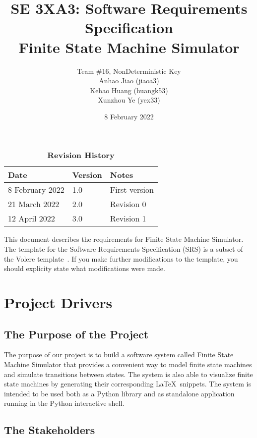 \documentclass[12pt, titlepage]{article}
\title{SE 3XA3: Software Requirements Specification \\
  Finite State Machine Simulator}
\author{
  Team \#16, NonDeterministic Key \\
  Anhao Jiao (jiaoa3) \\
  Kehao Huang (huangk53) \\
  Xunzhou Ye (yex33)
}
\date{8 February 2022}
\begin{document}
\maketitle

\tableofcontents
\listoftables
\listoffigures

\newpage

\begin{table}[H]
  \caption{\bf Revision History}
  \begin{tabularx}{\textwidth}{p{3cm}p{2cm}X}
    \toprule {\bf Date} & {\bf Version} & {\bf Notes}\\
    \midrule
    8 February 2022 & 1.0 & First version \\
    21 March 2022 & 2.0 & Revision 0\\
    12 April 2022 & 3.0 & Revision 1\\ 
    \bottomrule
  \end{tabularx}
\end{table}

\newpage


This document describes the requirements for Finite State Machine Simulator. The
template for the Software Requirements Specification (SRS) is a subset of the
Volere template~\citep{RobertsonAndRobertson2012}. If you make further
modifications to the template, you should explicity state what modifications
were made.

\section{Project Drivers}

\subsection{The Purpose of the Project}
The purpose of our project is to build a software system called Finite State
Machine Simulator that provides a convenient way to model finite state machines
and simulate transitions between states. The system is also able to visualize
finite state machines by generating their corresponding \LaTeX\ snippets. The
system is intended to be used both as a Python library and as standalone
application running in the Python interactive shell.

\subsection{The Stakeholders}
\end{document}
